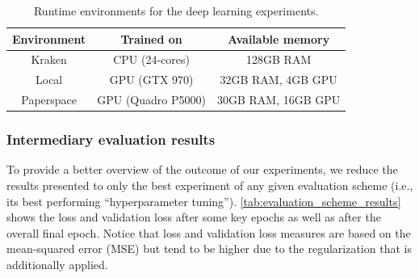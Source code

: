 \begin{table}[h]
  \centering
  \begin{tabular}{ ccc }
    \toprule
    \textbf{Environment} & \textbf{Trained on} & \textbf{Available memory} \\
    \midrule
    Kraken & CPU (24-cores) & 128GB RAM \\
    Local & GPU (GTX 970) & 32GB RAM, 4GB GPU \\
    Paperspace & GPU (Quadro P5000) & 30GB RAM, 16GB GPU \\
    \bottomrule
  \end{tabular}
  \caption{Runtime environments for the deep learning experiments.}
\label{tab:experimental_environments}
\end{table}

\clearpage
\subsubsection{Intermediary evaluation results}
To provide a better overview of the outcome of our experiments, we reduce the results presented to only the best experiment of any given evaluation scheme (i.e., its best performing ``hyperparameter tuning''). \cref{tab:evaluation_scheme_results} shows the loss and validation loss after some key epochs as well as after the overall final epoch. Notice that loss and validation loss measures are based on the mean-squared error (MSE) but tend to be higher due to the regularization that is additionally applied.

